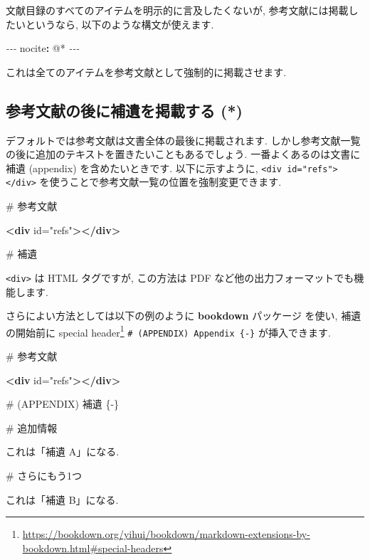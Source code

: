 \documentclass[
  11pt,
  lualatex,ja=standard,jafont=noto]{bxjsreport}
\newenvironment{Shaded}{\begin{snugshade}}{\end{snugshade}}
\newcommand{\AttributeTok}[1]{\textcolor[rgb]{0.77,0.63,0.00}{#1}}
\newcommand{\FunctionTok}[1]{\textcolor[rgb]{0.00,0.00,0.00}{#1}}
\newcommand{\KeywordTok}[1]{\textcolor[rgb]{0.13,0.29,0.53}{\textbf{#1}}}
\newcommand{\NormalTok}[1]{#1}
\newcommand{\OtherTok}[1]{\textcolor[rgb]{0.56,0.35,0.01}{#1}}
\newcommand{\PreprocessorTok}[1]{\textcolor[rgb]{0.56,0.35,0.01}{\textit{#1}}}
\newcommand{\StringTok}[1]{\textcolor[rgb]{0.31,0.60,0.02}{#1}}
\renewcommand{\href}[2]{#2\footnote{\url{#1}}}
\begin{document}
文献目録のすべてのアイテムを明示的に言及したくないが, 参考文献には掲載したいというなら, 以下のような構文が使えます.

\begin{Shaded}
\begin{Highlighting}[]
\PreprocessorTok{{-}{-}{-}}
\FunctionTok{nocite}\KeywordTok{:}\AttributeTok{ }\StringTok{\textquotesingle{}@*\textquotesingle{}}
\PreprocessorTok{{-}{-}{-}}
\end{Highlighting}
\end{Shaded}

これは全てのアイテムを参考文献として強制的に掲載させます.

\hypertarget{include-appendix-after-bibliography}{%
\subsection{参考文献の後に補遺を掲載する (*)}\label{include-appendix-after-bibliography}}

デフォルトでは参考文献は文書全体の最後に掲載されます. しかし参考文献一覧の後に追加のテキストを置きたいこともあるでしょう. 一番よくあるのは文書に補遺 (appendix) を含めたいときです. 以下に示すように, \texttt{\textless{}div\ id="refs"\textgreater{}\textless{}/div\textgreater{}} を使うことで参考文献一覧の位置を強制変更できます.

\begin{Shaded}
\begin{Highlighting}[]
\FunctionTok{\# 参考文献}

\KeywordTok{\textless{}div}\OtherTok{ id=}\StringTok{"refs"}\KeywordTok{\textgreater{}\textless{}/div\textgreater{}}

\FunctionTok{\# 補遺}
\end{Highlighting}
\end{Shaded}

\texttt{\textless{}div\textgreater{}} は HTML タグですが, この方法は PDF など他の出力フォーマットでも機能します.

さらによい方法としては以下の例のように \textbf{bookdown} パッケージ \autocite{R-bookdown} を使い, 補遺の開始前に \href{https://bookdown.org/yihui/bookdown/markdown-extensions-by-bookdown.html\#special-headers}{special header} \texttt{\# (APPENDIX) Appendix \{-\}} が挿入できます.

\begin{Shaded}
\begin{Highlighting}[]
\FunctionTok{\# 参考文献}

\KeywordTok{\textless{}div}\OtherTok{ id=}\StringTok{"refs"}\KeywordTok{\textgreater{}\textless{}/div\textgreater{}}

\FunctionTok{\# (APPENDIX) 補遺 \{{-}\} }

\FunctionTok{\# 追加情報}

\NormalTok{これは「補遺 A」になる.}

\FunctionTok{\# さらにもう1つ}

\NormalTok{これは「補遺 B」になる.}
\end{Highlighting}
\end{Shaded}
\end{document}
